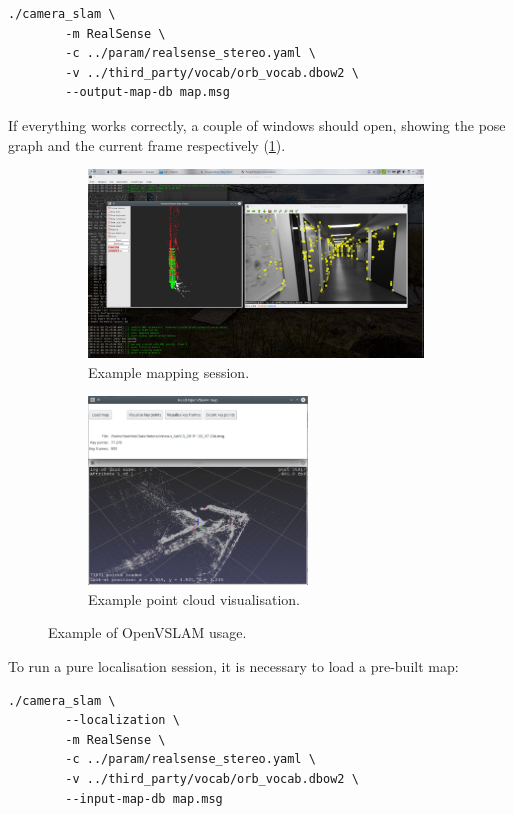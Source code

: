 \documentclass[11pt, letterpaper, twoside]{article}
\begin{document}
\begin{Verbatim}[samepage=true]
    ./camera_slam \
        -m RealSense \
        -c ../param/realsense_stereo.yaml \
        -v ../third_party/vocab/orb_vocab.dbow2 \
        --output-map-db map.msg
\end{Verbatim}

If everything works correctly, a couple of windows should open, showing the
pose graph and the current frame respectively (\cref{fig:openvslam_mapping}).

\begin{figure}[tb]
    \centering
    \begin{subfigure}[t]{.59\textwidth}
        \centering
        \includegraphics[height=5cm]{openvslam.png}
        \caption{Example mapping session.}\label{fig:openvslam_mapping}
    \end{subfigure}
    \begin{subfigure}[t]{.39\textwidth}
        \centering
        \includegraphics[height=5cm]{load_map.png}
        \caption{Example point cloud visualisation.}\label{fig:openvslam_load_map}
    \end{subfigure}
    \caption{Example of OpenVSLAM usage.}\label{fig:openvslam}
\end{figure}

To run a pure localisation session, it is necessary to load a pre-built map:

\begin{Verbatim}[samepage=true]
    ./camera_slam \
        --localization \
        -m RealSense \
        -c ../param/realsense_stereo.yaml \
        -v ../third_party/vocab/orb_vocab.dbow2 \
        --input-map-db map.msg
\end{Verbatim}
\end{document}
